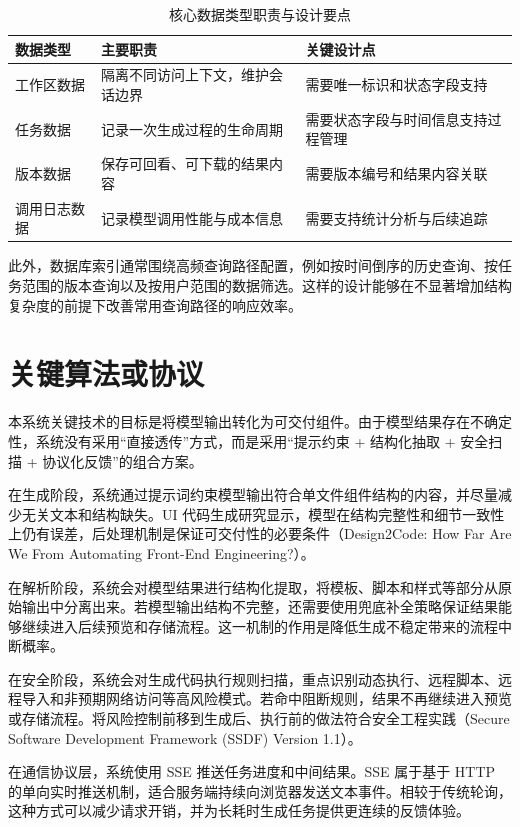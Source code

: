 \begin{table}[htbp]
\centering
\caption{核心数据类型职责与设计要点}
\label{tab:chapter2-table-design}
\small
\begin{tabular}{@{}p{}p{}p{}@{}}
\toprule
数据类型 & 主要职责 & 关键设计点 \\
\midrule
工作区数据 & 隔离不同访问上下文，维护会话边界 & 需要唯一标识和状态字段支持 \\
任务数据 & 记录一次生成过程的生命周期 & 需要状态字段与时间信息支持过程管理 \\
版本数据 & 保存可回看、可下载的结果内容 & 需要版本编号和结果内容关联 \\
调用日志数据 & 记录模型调用性能与成本信息 & 需要支持统计分析与后续追踪 \\
\bottomrule
\end{tabular}
\end{table}

此外，数据库索引通常围绕高频查询路径配置，例如按时间倒序的历史查询、按任务范围的版本查询以及按用户范围的数据筛选。这样的设计能够在不显著增加结构复杂度的前提下改善常用查询路径的响应效率。

\section{关键算法或协议}
本系统关键技术的目标是将模型输出转化为可交付组件。由于模型结果存在不确定性，系统没有采用“直接透传”方式，而是采用“提示约束 + 结构化抽取 + 安全扫描 + 协议化反馈”的组合方案。

在生成阶段，系统通过提示词约束模型输出符合单文件组件结构的内容，并尽量减少无关文本和结构缺失。UI 代码生成研究显示，模型在结构完整性和细节一致性上仍有误差，后处理机制是保证可交付性的必要条件（Design2Code: How Far Are We From Automating Front-End Engineering?）\cite{si2024design2code}。

在解析阶段，系统会对模型结果进行结构化提取，将模板、脚本和样式等部分从原始输出中分离出来。若模型输出结构不完整，还需要使用兜底补全策略保证结果能够继续进入后续预览和存储流程。这一机制的作用是降低生成不稳定带来的流程中断概率。

在安全阶段，系统会对生成代码执行规则扫描，重点识别动态执行、远程脚本、远程导入和非预期网络访问等高风险模式。若命中阻断规则，结果不再继续进入预览或存储流程。将风险控制前移到生成后、执行前的做法符合安全工程实践（Secure Software Development Framework (SSDF) Version 1.1）\cite{nistssdf2024}。

在通信协议层，系统使用 SSE 推送任务进度和中间结果。SSE 属于基于 HTTP 的单向实时推送机制，适合服务端持续向浏览器发送文本事件。相较于传统轮询，这种方式可以减少请求开销，并为长耗时生成任务提供更连续的反馈体验。

